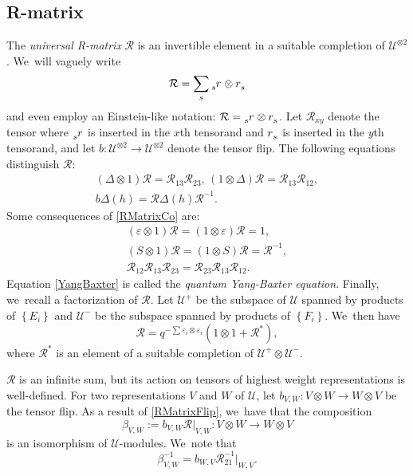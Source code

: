 \documentclass[11pt]{article}
\let\epsilon\varepsilon
\theoremstyle{definition}
\newcommand{\UU}{\mathcal{U}}
\begin{document}
\subsection{R-matrix}\label{RMatrix}
The \textit{universal R-matrix} $\mathcal{R}$ is an invertible element in a suitable completion of $\mathcal{U}^{\otimes 2}$. We~will vaguely write
\[
\mathcal{R}=\sum_s\tensor[_s]{r}{}\otimes \tensor[]{r}{_s}
\]
and even employ an Einstein-like notation: $\mathcal{R}=\tensor[_s]{r}{}\otimes \tensor[]{r}{_s}$.
Let $\mathcal{R}_{xy}$ denote the tensor where $\tensor[_s]{r}{}$ is inserted in the $x$th tensorand and $\tensor[]{r}{_s}$ is inserted in the $y$th tensorand, and let $b:\mathcal{U}^{\otimes 2}\to\mathcal{U}^{\otimes 2}$ denote the tensor flip.
The following equations distinguish $\mathcal{R}$:
\begin{gather}
(\Delta\otimes 1)\mathcal{R}=\mathcal{R}_{13}\mathcal{R}_{23},\,(1\otimes\Delta)\mathcal{R}=\mathcal{R}_{13}\mathcal{R}_{12},\label{RMatrixCo}\\
b\Delta(h)=\mathcal{R}\Delta(h)\mathcal{R}^{-1}.\label{RMatrixFlip}
\end{gather}
Some consequences of \eqref{RMatrixCo} are:
\begin{gather}
(\epsilon\otimes 1)\mathcal{R}=(1\otimes\epsilon)\mathcal{R}=1\label{RMatrixCounit},\\
(S\otimes 1)\mathcal{R}=(1\otimes S)\mathcal{R}=\mathcal{R}^{-1}\label{RMatrixInverse},\\
\mathcal{R}_{12}\mathcal{R}_{13}\mathcal{R}_{23}=\mathcal{R}_{23}\mathcal{R}_{13}\mathcal{R}_{12}.\label{YangBaxter}
\end{gather}
Equation \eqref{YangBaxter} is called the \textit{quantum Yang-Baxter equation}.
Finally, we~recall a factorization of $\mathcal{R}$.
Let $\UU^+$ be the subspace of $\UU$ spanned by products of $\left\{ E_i \right\}$ and $\UU^-$ be the subspace spanned by products of $\left\{ F_i \right\}$. We~then have
\begin{equation}
\mathcal{R}=q^{-\sum \epsilon_i\otimes \epsilon_i}(1\otimes 1+\mathcal{R}^*),
\label{RFactor}
\end{equation}
where $\mathcal{R}^*$ is an element of a suitable completion of $\UU^+\otimes\UU^-$.

$\mathcal{R}$ is an infinite sum, but its action on tensors of highest weight representations is well-defined.
For two representations $V$ and $W$ of $\mathcal{U}$, let $b_{V,W}:V\otimes W\to W\otimes V$ be the tensor flip.
As a result of \eqref{RMatrixFlip}, we~have that the composition
\[
\beta_{V,W}:=b_{V,W}\mathcal{R}\big|_{V,W}:V\otimes W\to W\otimes V
\]
is an isomorphism of $\mathcal{U}$-modules. We~note that
\[
\beta_{V,W}^{-1} = b_{W, V}\mathcal{R}^{-1}_{21}\big|_{W,V}.
\]
\end{document}
